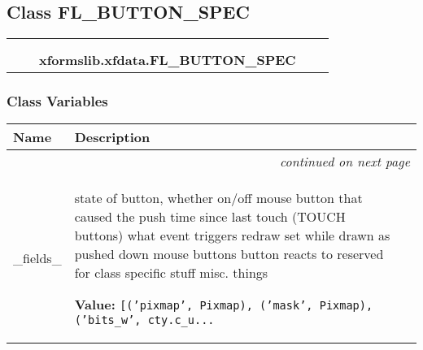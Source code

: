 

\subsection{Class FL\_BUTTON\_SPEC}

    \label{xformslib:xfdata:FL_BUTTON_SPEC}
\begin{tabular}{cccccc}
\multicolumn{2}{r}{\settowidth{\BCL}{ctypes.Structure}\multirow{2}{\BCL}{ctypes.Structure}}
&&
  \\\cline{3-3}
  &&\multicolumn{1}{c|}{}
&&
  \\
&&\multicolumn{2}{l}{\textbf{xformslib.xfdata.FL\_BUTTON\_SPEC}}
\end{tabular}



  \subsubsection{Class Variables}

    \vspace{-1cm}
\hspace{\varindent}\begin{longtable}{|p{\varnamewidth}|p{\vardescrwidth}|l}
\cline{1-2}
\cline{1-2} \centering \textbf{Name} & \centering \textbf{Description}& \\
\cline{1-2}
\endhead\cline{1-2}\multicolumn{3}{r}{\small\textit{continued on next page}}\\\endfoot\cline{1-2}
\endlastfoot\raggedright \_\-f\-i\-e\-l\-d\-s\-\_\- & \raggedright state of button, whether on/off
mouse button that caused the push
time since last touch (TOUCH buttons)
what event triggers redraw
set while drawn as pushed down
mouse buttons button reacts to
reserved for class specific stuff
misc. things

\textbf{Value:} 
{\tt [('pixmap', Pixmap), ('mask', Pixmap), ('bits\_w', cty.c\_u\texttt{...}}&\\
\cline{1-2}
\end{longtable}

